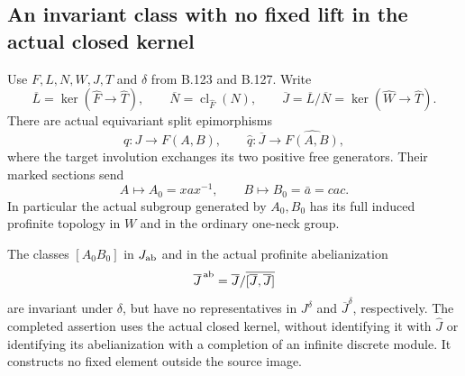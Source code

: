 \subsection*{An invariant class with no fixed lift in the actual closed kernel}

\label{stmt:B129}
Use \(F,L,N,W,J,T\) and \(\delta\) from B.123 and B.127.
Write
\[
 \overline L=\ker(\widehat F\to\widehat T),\qquad
 \overline N=\operatorname{cl}_{\widehat F}(N),\qquad
 \overline J=\overline L/\overline N
             =\ker(\widehat W\to\widehat T).
\]
There are actual equivariant split epimorphisms
\begin{equation}\label{eq:B129-retracts}
 q:J\longrightarrow F(A,B),\qquad
 \widehat q:\overline J\longrightarrow\widehat{F(A,B)},
\end{equation}
where the target involution exchanges its two positive free
generators. Their marked sections send
\begin{equation}\label{eq:B129-section}
 A\longmapsto A_0=xax^{-1},\qquad
 B\longmapsto B_0=\bar a=cac .
\end{equation}
In particular the actual subgroup generated by \(A_0,B_0\)
has its full induced profinite topology in \(W\) and in the
ordinary one-neck group.

The classes \([A_0B_0]\) in \(J_{\rm ab}\) and in the actual
profinite abelianization
\[
 \overline J^{\,\rm ab}
   =\overline J/\overline{[\overline J,\overline J]}
\]
are invariant under \(\delta\), but have no representatives in
\(J^\delta\) and \(\overline J^\delta\), respectively. The
completed assertion uses the actual closed kernel, without
identifying it with \(\widehat J\) or identifying its abelianization
with a completion of an infinite discrete module. It constructs
no fixed element outside the source image.

